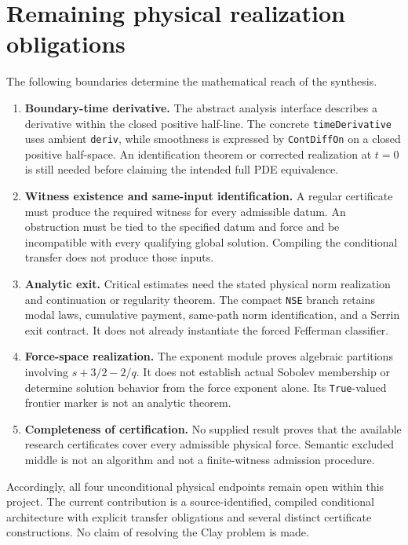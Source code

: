 \documentclass[11pt,a4paper]{article}
\theoremstyle{remark}\newtheorem{remark}[proposition]{Remark}
\newcommand{\code}[1]{\nolinkurl{#1}}
\begin{document}
\section{Remaining physical realization obligations}\label{sec:frontier}
The following boundaries determine the mathematical reach of the synthesis.
\begin{enumerate}
\item \textbf{Boundary-time derivative.} The abstract analysis interface describes a derivative within the closed positive half-line. The concrete \code{timeDerivative} uses ambient \code{deriv}, while smoothness is expressed by \code{ContDiffOn} on a closed positive half-space. An identification theorem or corrected realization at $t=0$ is still needed before claiming the intended full PDE equivalence.
\item \textbf{Witness existence and same-input identification.} A regular certificate must produce the required witness for every admissible datum. An obstruction must be tied to the specified datum and force and be incompatible with every qualifying global solution. Compiling the conditional transfer does not produce those inputs.
\item \textbf{Analytic exit.} Critical estimates need the stated physical norm realization and continuation or regularity theorem. The compact \code{NSE} branch retains modal laws, cumulative payment, same-path norm identification, and a Serrin exit contract. It does not already instantiate the forced Fefferman classifier.
\item \textbf{Force-space realization.} The exponent module proves algebraic partitions involving $s+3/2-2/q$. It does not establish actual Sobolev membership or determine solution behavior from the force exponent alone. Its \code{True}-valued frontier marker is not an analytic theorem.
\item \textbf{Completeness of certification.} No supplied result proves that the available research certificates cover every admissible physical force. Semantic excluded middle is not an algorithm and not a finite-witness admission procedure.
\end{enumerate}

Accordingly, all four unconditional physical endpoints remain open within this project. The current contribution is a source-identified, compiled conditional architecture with explicit transfer obligations and several distinct certificate constructions. No claim of resolving the Clay problem is made.
\end{document}
